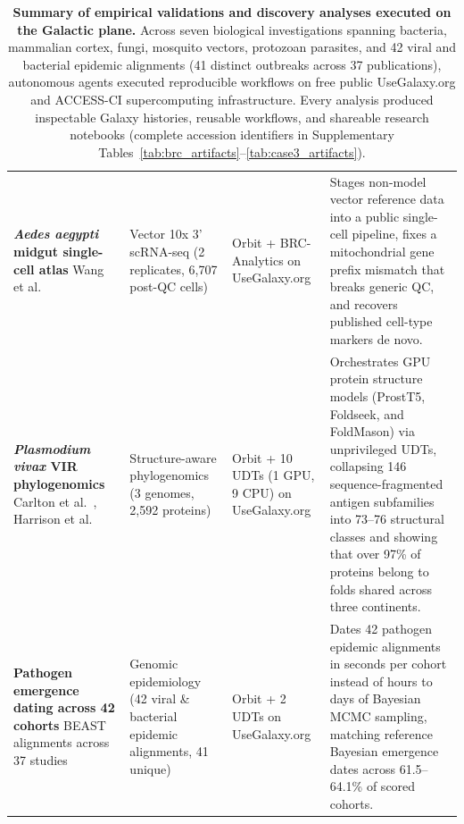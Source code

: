 \documentclass[11pt,letterpaper]{article}
\begin{document}
\begin{table}[!htbp]
\begin{tabularx}{\textwidth}{p{2.9cm}p{2.3cm}p{2.3cm}X}
\addlinespace[0.35em]
\textbf{\textit{Aedes aegypti} midgut single-cell atlas} \newline Wang et al.\ \cite{wang2024} & Vector 10x 3' scRNA-seq \newline (2 replicates, 6,707 post-QC cells) & Orbit + BRC-Analytics on UseGalaxy.org & Stages non-model vector reference data into a public single-cell pipeline, fixes a mitochondrial gene prefix mismatch that breaks generic QC, and recovers published cell-type markers de novo. \\
\addlinespace[0.35em]
\textbf{\textit{Plasmodium vivax} VIR phylogenomics} \newline Carlton et al.\ \cite{carlton2008}, Harrison et al.\ \cite{harrison2020} & Structure-aware phylogenomics \newline (3 genomes, 2,592 proteins) & Orbit + 10 UDTs (1 GPU, 9 CPU) on UseGalaxy.org & Orchestrates GPU protein structure models (ProstT5, Foldseek, and FoldMason) via unprivileged UDTs, collapsing 146 sequence-fragmented antigen subfamilies into 73--76 structural classes and showing that over 97\% of proteins belong to folds shared across three continents. \\
\addlinespace[0.35em]
\textbf{Pathogen emergence dating across 42 cohorts} \newline 42 BEAST alignments across 37 studies \cite{gire2014genomic, dudas2017virus, hill2019skygrid, faria2021genomics, pond2026hyphaeon} & Genomic epidemiology \newline (42 viral \& bacterial epidemic alignments, 41 unique) & Orbit + 2 UDTs on UseGalaxy.org & Dates 42 pathogen epidemic alignments in seconds per cohort instead of hours to days of Bayesian MCMC sampling, matching reference Bayesian emergence dates across 61.5--64.1\% of scored cohorts. \\
\bottomrule
\end{tabularx}
\caption{\textbf{Summary of empirical validations and discovery analyses executed on the Galactic plane.} Across seven biological investigations spanning bacteria, mammalian cortex, fungi, mosquito vectors, protozoan parasites, and 42 viral and bacterial epidemic alignments (41 distinct outbreaks across 37 publications), autonomous agents executed reproducible workflows on free public UseGalaxy.org and ACCESS-CI supercomputing infrastructure. Every analysis produced inspectable Galaxy histories, reusable workflows, and shareable research notebooks (complete accession identifiers in Supplementary Tables~\ref{tab:brc_artifacts}--\ref{tab:case3_artifacts}).}
\label{tab:validation_summary}
\end{table}
\end{document}
